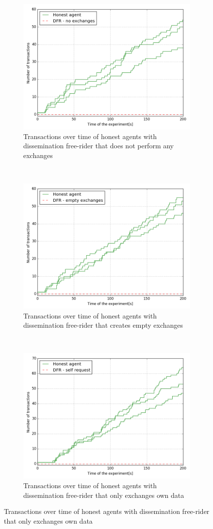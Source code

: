 \begin{figure}
    \begin{subfigure}{\textwidth}
      \centering
      \includegraphics[width=.6\linewidth]{images/DFR_no_exchanges}
      \caption{Transactions over time of honest agents with dissemination free-rider that does not 
      perform any exchanges}
      \label{fig:DFR_no_exchanges}
    \end{subfigure}\\
    \begin{subfigure}{\textwidth}
      \centering
      \includegraphics[width=.6\linewidth]{images/DFR_empty_exchanges}
      \caption{Transactions over time of honest agents with dissemination free-rider that creates 
      empty exchanges}
      \label{fig:DFR_empty_exchanges}
    \end{subfigure}\\
    \begin{subfigure}{\textwidth}
        \centering
        \includegraphics[width=.6\linewidth]{images/DFR_self_request}
        \caption{Transactions over time of honest agents with dissemination free-rider that only 
        exchanges own data}
        \label{fig:DFR_self_request}
      \end{subfigure}
\end{figure}

